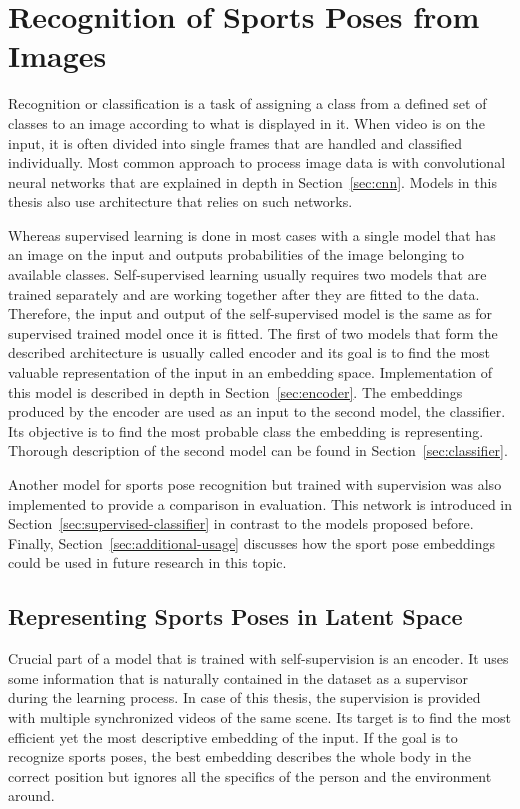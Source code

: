 \chapter{\label{chap:classification}Recognition of Sports Poses from Images}

Recognition or classification is a task of assigning a class from a defined set of classes to an image according to what is displayed in it. When video is on the input, it is often divided into single frames that are handled and classified individually. Most common approach to process image data is with convolutional neural networks that are explained in depth in Section~\ref{sec:cnn}. Models in this thesis also use architecture that relies on such networks.

Whereas supervised learning is done in most cases with a single model that has an image on the input and outputs probabilities of the image belonging to available classes. Self-supervised learning usually requires two models that are trained separately and are working together after they are fitted to the data. Therefore, the input and output of the self-supervised model is the same as for supervised trained model once it is fitted. The first of two models that form the described architecture is usually called encoder and its goal is to find the most valuable representation of the input in an embedding space. Implementation of this model is described in depth in Section~\ref{sec:encoder}. The embeddings produced by the encoder are used as an input to the second model, the classifier. Its objective is to find the most probable class the embedding is representing. Thorough description of the second model can be found in Section~\ref{sec:classifier}.

Another model for sports pose recognition but trained with supervision was also implemented to provide a comparison in evaluation. This network is introduced in Section~\ref{sec:supervised-classifier} in contrast to the models proposed before. Finally, Section~\ref{sec:additional-usage} discusses how the sport pose embeddings could be used in future research in this topic.

\section{\label{sec:encoder}Representing Sports Poses in Latent Space}

Crucial part of a model that is trained with self-supervision is an encoder. It uses some information that is naturally contained in the dataset as a supervisor during the learning process. In case of this thesis, the supervision is provided with multiple synchronized videos of the same scene. Its target is to find the most efficient yet the most descriptive embedding of the input. If the goal is to recognize sports poses, the best embedding describes the whole body in the correct position but ignores all the specifics of the person and the environment around.

